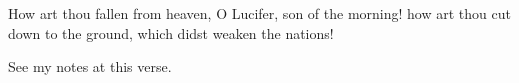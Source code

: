 			
			\begin{compactdesc}
				\item[{\hyperref[ISAIAH-14-12]{Isaiah 14:12}}] How art thou fallen from heaven, O Lucifer, son of the morning!  how art thou cut down to the ground, which didst weaken the nations!
					\begin{compactitem}
						\item See my notes at this verse.
					\end{compactitem}
			\end{compactdesc}
			
		
			
				
			
